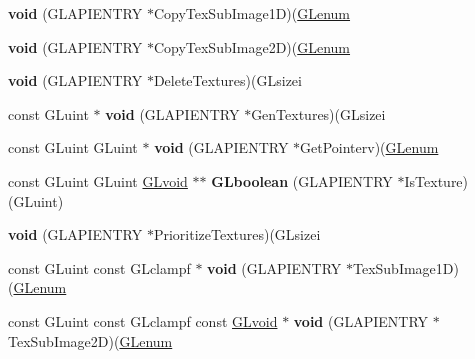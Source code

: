\begin{DoxyCompactItemize}
{\bfseries void} (G\+L\+A\+P\+I\+E\+N\+T\+RY $\ast$Copy\+Tex\+Sub\+Image1D)(\hyperlink{interfacevoid}{G\+Lenum}
\item 
\mbox{\label{struct_____g_ldispatch_table_rec_a55d4968c9b592262c5a18a61e8207689}} 
{\bfseries void} (G\+L\+A\+P\+I\+E\+N\+T\+RY $\ast$Copy\+Tex\+Sub\+Image2D)(\hyperlink{interfacevoid}{G\+Lenum}
\item 
\mbox{\label{struct_____g_ldispatch_table_rec_ab8d74649fa252abd5b8a4715e19b33e1}} 
{\bfseries void} (G\+L\+A\+P\+I\+E\+N\+T\+RY $\ast$Delete\+Textures)(G\+Lsizei
\item 
\mbox{\label{struct_____g_ldispatch_table_rec_a1157124cb8df751e600f740e045e4d27}} 
const G\+Luint $\ast$ {\bfseries void} (G\+L\+A\+P\+I\+E\+N\+T\+RY $\ast$Gen\+Textures)(G\+Lsizei
\item 
\mbox{\label{struct_____g_ldispatch_table_rec_a4c37080baf00de1b52619f4ac9c54dfd}} 
const G\+Luint G\+Luint $\ast$ {\bfseries void} (G\+L\+A\+P\+I\+E\+N\+T\+RY $\ast$Get\+Pointerv)(\hyperlink{interfacevoid}{G\+Lenum}
\item 
\mbox{\label{struct_____g_ldispatch_table_rec_aaa25a9175955237d833be7ede2f81c2c}} 
const G\+Luint G\+Luint \hyperlink{interfacevoid}{G\+Lvoid} $\ast$$\ast$ {\bfseries G\+Lboolean} (G\+L\+A\+P\+I\+E\+N\+T\+RY $\ast$Is\+Texture)(G\+Luint)
\item 
\mbox{\label{struct_____g_ldispatch_table_rec_a4fa983b31f806547d19a9152384ce2ef}} 
{\bfseries void} (G\+L\+A\+P\+I\+E\+N\+T\+RY $\ast$Prioritize\+Textures)(G\+Lsizei
\item 
\mbox{\label{struct_____g_ldispatch_table_rec_a998350bcade0ae2d03c1c3601a27f947}} 
const G\+Luint const G\+Lclampf $\ast$ {\bfseries void} (G\+L\+A\+P\+I\+E\+N\+T\+RY $\ast$Tex\+Sub\+Image1D)(\hyperlink{interfacevoid}{G\+Lenum}
\item 
\mbox{\label{struct_____g_ldispatch_table_rec_a4c3628add153e6e7aa0499fc02256296}} 
const G\+Luint const G\+Lclampf const \hyperlink{interfacevoid}{G\+Lvoid} $\ast$ {\bfseries void} (G\+L\+A\+P\+I\+E\+N\+T\+RY $\ast$Tex\+Sub\+Image2D)(\hyperlink{interfacevoid}{G\+Lenum}
$$
\end{DoxyCompactItemize}
